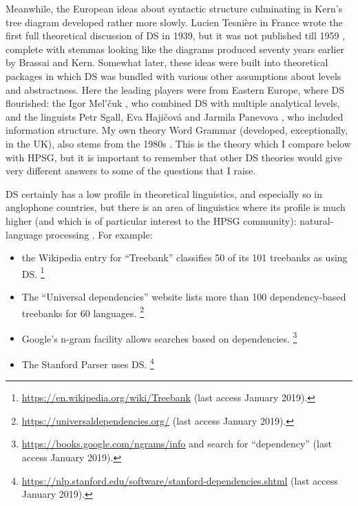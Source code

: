 \documentclass[output=paper
 	        ,biblatex
                ,babelshorthands
                ,newtxmath
                ,draftmode
                ,colorlinks, citecolor=brown
]{langscibook}
\begin{document}
Meanwhile, the European ideas about syntactic structure culminating in Kern’s tree diagram developed rather more slowly. Lucien Tesnière in France wrote the first full theoretical discussion of DS in 1939, but it was not published till 1959 \citep{Tesniere59a-u,Tesniere2015a-u}, complete with stemmas looking like the diagrams produced seventy years earlier by Brassai and Kern. Somewhat later, these ideas were built into theoretical packages in which DS was bundled with various other assumptions about levels and abstractness. Here the leading players were from Eastern Europe, where DS flourished: the  Igor Mel’čuk \citep{Melcuk88a-u}, who combined DS with multiple analytical levels, and the  linguists Petr Sgall, Eva Hajičová and Jarmila Panevova \citep{Sgall&co1986}, who included information structure. My own theory Word Grammar (developed, exceptionally, in the UK), also stems from the 1980s \citep{Hudson84a-u,Hudson90a-u,Sugayama2002,Hudson2007a-u,Gisborne2008,Rosta2008,Gisborne2010,Hudson2010b-u,Gisborne2011,Duran-Eppler2011,TraugottTrousdale2013,Duran-Eppler&co2016,Hudson2016,Hudson2017,Hudson2018a,Gisborne2019}. This is the theory which I compare below with HPSG, but it is important to remember that other DS theories would give very different answers to some of the questions that I raise.

DS certainly has a low profile in theoretical linguistics, and especially so in anglophone countries, but there is an area of linguistics where its profile is much higher (and which is of particular interest to the HPSG community): natural-language processing \citep{KMcDN2009a-u}. For example:

\begin{itemize}
	\item the Wikipedia entry for ``Treebank'' classifies 50 of its 101 treebanks as using DS.%
	\footnote{\url{https://en.wikipedia.org/wiki/Treebank} (last access January 2019).}%
	
	
	\item The ``Universal dependencies'' website lists more than 100 dependency-based treebanks for 60 languages.%
	\footnote{\url{https://universaldependencies.org/} (last access January 2019).}%
	
	
	\item Google’s n-gram facility allows searches based on dependencies.%
	\footnote{\url{https://books.google.com/ngrams/info} and search for ``dependency'' (last access January 2019).}%
	
	
	\item The Stanford Parser \citep{ChenManning2014,deMarneffe&co2014} uses DS.%
	\footnote{\url{https://nlp.stanford.edu/software/stanford-dependencies.shtml} (last access January 2019).}%
	
\end{itemize}
\end{document}
